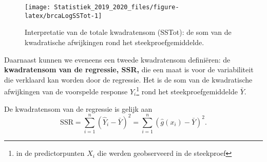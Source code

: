 \documentclass[12pt,dutch,coursenotes]{book}
\newenvironment{Shaded}{\begin{snugshade}}{\end{snugshade}}
\newcommand{\KeywordTok}[1]{\textcolor[rgb]{0.13,0.29,0.53}{\textbf{#1}}}
\newcommand{\DataTypeTok}[1]{\textcolor[rgb]{0.13,0.29,0.53}{#1}}
\newcommand{\DecValTok}[1]{\textcolor[rgb]{0.00,0.00,0.81}{#1}}
\newcommand{\FloatTok}[1]{\textcolor[rgb]{0.00,0.00,0.81}{#1}}
\newcommand{\StringTok}[1]{\textcolor[rgb]{0.31,0.60,0.02}{#1}}
\newcommand{\ControlFlowTok}[1]{\textcolor[rgb]{0.13,0.29,0.53}{\textbf{#1}}}
\newcommand{\OperatorTok}[1]{\textcolor[rgb]{0.81,0.36,0.00}{\textbf{#1}}}
\newcommand{\NormalTok}[1]{#1}
\let\rmarkdownfootnote\footnote%
\def\footnote{\protect\rmarkdownfootnote}
\theoremstyle{definition}
\theoremstyle{definition}
\theoremstyle{definition}
\theoremstyle{remark}
\begin{document}
\begin{Shaded}
\end{Shaded}

\begin{figure}

{\centering \texttt{[image: Statistiek\_2019\_2020\_files/figure-latex/brcaLogSSTot-1]} 

}

\caption{Interpretatie van de totale kwadratensom (SSTot): de som van de kwadratische afwijkingen rond het steekproefgemiddelde.}\label{fig:brcaLogSSTot}
\end{figure}

Daarnaast kunnen we eveneens een tweede kwadratensom definiëren: de
\textbf{kwadratensom van de regressie, SSR,} die een maat is voor de
variabiliteit die verklaard kan worden door de regressie. Het is de som
van de kwadratische afwijkingen van de voorspelde response
\(\hat{Y}_i\)\footnote{in de predictorpunten \(X_i\) die werden
  geobserveerd in de steekproef} rond het steekproefgemiddelde
\(\bar Y\).

De kwadratensom van de regressie is gelijk aan
\[\text{SSR} = \sum_{i=1}^n (\hat{Y}_i - \bar{Y})^2 = \sum_{i=1}^n (\hat{g}(x_i) - \bar{Y})^2.\]
\end{document}
